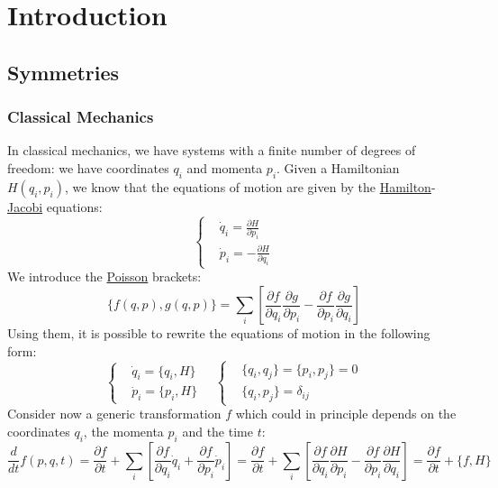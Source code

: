 \documentclass[../main.tex]{subfiles}
\begin{document}
\setchapterpreamble[u]{\margintoc}
\chapter[Introduction]{Introduction\footnotemark[0]}
\section{Symmetries}
\subsection{Classical Mechanics}
In classical mechanics, we have systems with a finite number of degrees of freedom: we have coordinates $q_i$ and momenta $p_i$. Given a Hamiltonian $H(q_i,p_i)$, we know that the equations of motion are given by the \href{https://en.wikipedia.org/wiki/William_Rowan_Hamilton}{Hamilton}-\href{https://en.wikipedia.org/wiki/William_Rowan_Hamilton}{Jacobi} equations:
\[
\left\{
\begin{aligned}
&\Dot{q}_i=\frac{\partial H}{\partial p_i}\\
&\Dot{p}_i=-\frac{\partial H}{\partial q_i}
\end{aligned}
\right.
\]
We introduce the \href{https://en.wikipedia.org/wiki/Siméon-Denis_Poisson}{Poisson} brackets:
\[
\{f(q,p),g(q,p)\}=\sum_i\left[\frac{\partial f}{\partial q_i}\frac{\partial g}{\partial p_i}-\frac{\partial f}{\partial p_i}\frac{\partial g}{\partial q_i}\right]
\]
Using them, it is possible to rewrite the equations of motion in the following form:
\[
\left\{
\begin{aligned}
&\Dot{q}_i=\{q_i,H\}\\
&\Dot{p}_i=\{p_i,H\}
\end{aligned}
\right.
\quad
\left\{
\begin{aligned}
&\{q_i,q_j\}=\{p_i,p_j\}=0\\
&\{q_i,p_j\}=\delta_{ij}
\end{aligned}
\right.
\]
Consider now a generic transformation $f$ which could in principle depends on the coordinates $q_i$, the momenta $p_i$ and the time $t$:
\[
\frac{d}{dt}f(p,q,t)=\frac{\partial f}{\partial t}+\sum_i\left[\frac{\partial f}{\partial q_i}\Dot{q}_i+\frac{\partial f}{\partial p_i}\Dot{p}_i\right]=\frac{\partial f}{\partial t}+\sum_i\left[\frac{\partial f}{\partial q_i}\frac{\partial H}{\partial p_i}-\frac{\partial f}{\partial p_i}\frac{\partial H}{\partial q_i}\right]=\frac{\partial f}{\partial t}+\{f,H\}
\]
\end{document}
